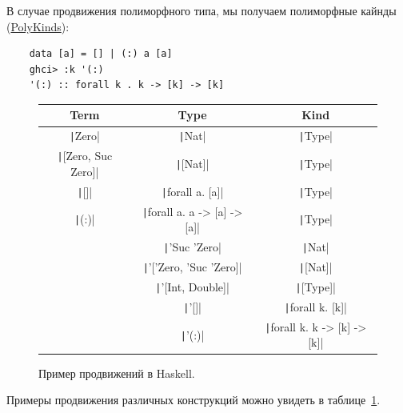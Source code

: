 В случае продвижения полиморфного типа, мы получаем полиморфные кайнды (\href{https://downloads.haskell.org/ghc/latest/docs/users_guide/exts/poly_kinds.html}{PolyKinds}):
\begin{verbatim}
    data [a] = [] | (:) a [a]
    ghci> :k '(:)
    '(:) :: forall k . k -> [k] -> [k]
\end{verbatim}

\begin{figure}
    \centering
    \begin{tabular}{|c|c|c|}
        \hline
        Term                                   & Type                                            & Kind                                            \\
        \hline
        \texttt|Zero|             & \texttt|Nat|                       & \texttt|Type|                      \\
        \texttt|[Zero, Suc Zero]| & \texttt|[Nat]|                     & \texttt|Type|                      \\
        \texttt|[]|               & \texttt|forall a. [a]|             & \texttt|Type|                      \\
        \texttt|(:)|              & \texttt|forall a. a -> [a] -> [a]| & \texttt|Type|                      \\
        & \texttt|'Suc 'Zero|                & \texttt|Nat|                       \\
        & \texttt|'['Zero, 'Suc 'Zero]|      & \texttt|[Nat]|                     \\
        & \texttt|'[Int, Double]|            & \texttt|[Type]|                    \\
        & \texttt|'[]|                       & \texttt|forall k. [k]|             \\
        & \texttt|'(:)|                      & \texttt|forall k. k -> [k] -> [k]| \\
        \hline
    \end{tabular}
    \caption{Пример продвижений в Haskell.}
    \label{fig:universes}
\end{figure}

Примеры продвижения различных конструкций можно увидеть в таблице~\ref{fig:universes}.

